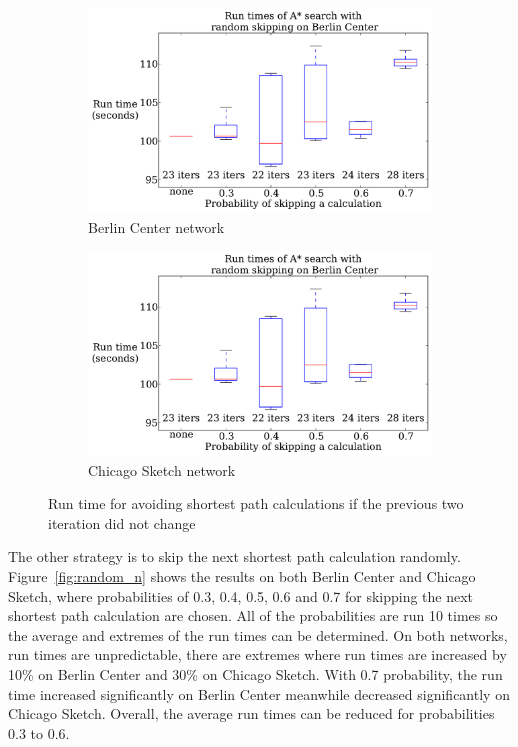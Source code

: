 \begin{figure}[!ht]
    \centering
    \begin{subfigure}{.5\textwidth}
        \centering
        \includegraphics[page=3,width=\textwidth]{img/random_time}
        \caption{Berlin Center network}
        \label{fig:berlin_skip_n}
    \end{subfigure}%
    \begin{subfigure}{.5\textwidth}
        \centering
        \includegraphics[page=4,width=\textwidth]{img/random_time}
        \caption{Chicago Sketch network}
        \label{fig:chicago_skip_n}
    \end{subfigure}
    \caption{Run time for avoiding shortest path calculations if the previous two iteration did not change}
    \label{fig:skip_n}
\end{figure}


The other strategy is to skip the next shortest path calculation randomly.
Figure~\ref{fig:random_n} shows the results on both Berlin Center and Chicago Sketch, where probabilities of 0.3, 0.4, 0.5, 0.6 and 0.7 for skipping the next shortest path calculation are chosen.
All of the probabilities are run 10 times so the average and extremes of the run times can be determined.
On both networks, run times are unpredictable,
there are extremes where run times are increased by 10\% on Berlin Center and 30\% on Chicago Sketch. With 0.7 probability, the run time increased significantly on Berlin Center meanwhile decreased significantly on Chicago Sketch.
Overall, the average run times can be reduced for probabilities 0.3 to 0.6.

